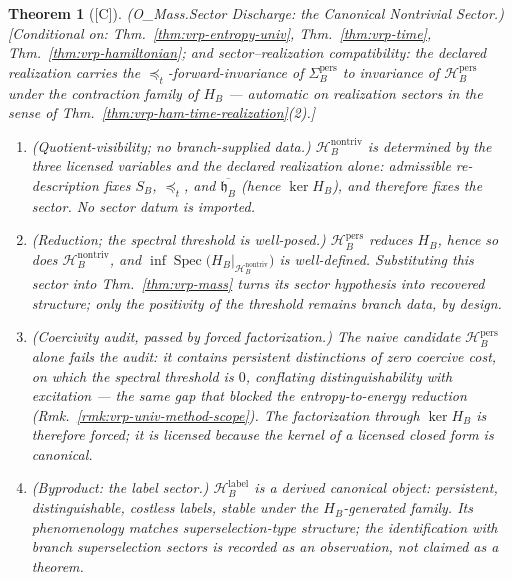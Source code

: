 \documentclass[12pt,oneside]{amsbook}
\theoremstyle{plain}
\newtheorem{theorem}{Theorem}[section]
\theoremstyle{definition}
\theoremstyle{remark}
\newcommand{\status}[1]{\textup{[#1]}}
\begin{document}
\begin{theorem}[\status{C}]\label{thm:vrp-mass-sector}
\textup{(O\_Mass.Sector Discharge: the Canonical Nontrivial
Sector.)}
\textup{[Conditional on: Thm.~\ref{thm:vrp-entropy-univ},
Thm.~\ref{thm:vrp-time}, Thm.~\ref{thm:vrp-hamiltonian}; and
sector--realization compatibility: the declared realization
carries the $\preceq_t$-forward-invariance of
$\Sigma_B^{\mathrm{pers}}$ to invariance of
$\mathcal{H}_B^{\mathrm{pers}}$ under the contraction family of
$H_B$ --- automatic on realization sectors in the sense of
Thm.~\ref{thm:vrp-ham-time-realization}(2).]}
\begin{enumerate}[label=\textup{(\arabic*)}]
  \item \emph{(Quotient-visibility; no branch-supplied data.)}
    $\mathcal{H}_B^{\mathrm{nontriv}}$ is determined by the three
    licensed variables and the declared realization alone:
    admissible re-description fixes $S_B$, $\preceq_t$, and
    $\overline{\mathfrak{h}_B}$ (hence $\ker H_B$), and therefore
    fixes the sector.  No sector datum is imported.
  \item \emph{(Reduction; the spectral threshold is
    well-posed.)}  $\mathcal{H}_B^{\mathrm{pers}}$ reduces $H_B$,
    hence so does $\mathcal{H}_B^{\mathrm{nontriv}}$, and
    $\inf \operatorname{Spec}\bigl(H_B|_{\mathcal{H}_B^{\mathrm{nontriv}}}\bigr)$
    is well-defined.  Substituting this sector into
    Thm.~\ref{thm:vrp-mass} turns its sector hypothesis into
    recovered structure; only the \emph{positivity} of the
    threshold remains branch data, by design.
  \item \emph{(Coercivity audit, passed by forced
    factorization.)}  The naive candidate
    $\mathcal{H}_B^{\mathrm{pers}}$ alone fails the audit: it
    contains persistent distinctions of zero coercive cost, on
    which the spectral threshold is $0$, conflating
    distinguishability with excitation --- the same gap that
    blocked the entropy-to-energy reduction
    (Rmk.~\ref{rmk:vrp-univ-method-scope}).  The factorization
    through $\ker H_B$ is therefore forced; it is licensed because
    the kernel of a licensed closed form is canonical.
  \item \emph{(Byproduct: the label sector.)}
    $\mathcal{H}_B^{\mathrm{label}}$ is a derived canonical
    object: persistent, distinguishable, costless labels, stable
    under the $H_B$-generated family.  Its phenomenology matches
    superselection-type structure; the identification with branch
    superselection sectors is recorded as an observation, not
    claimed as a theorem.
\end{enumerate}
\end{theorem}
\end{document}
